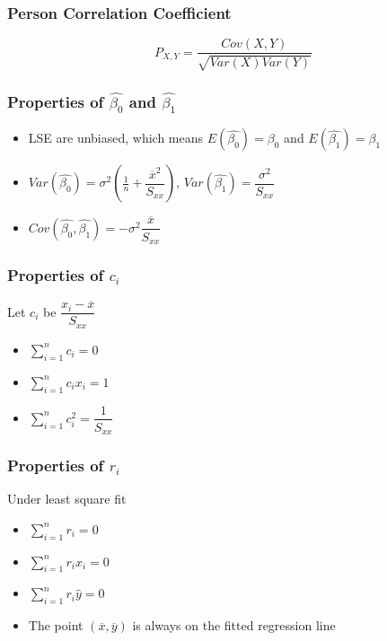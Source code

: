 \documentclass[11pt]{article}
\begin{document}
\subsubsection{Person Correlation Coefficient}
\[P_{X,Y} = \frac{Cov(X,Y)}{\sqrt{Var(X)Var(Y)}}\]
\subsubsection{Properties of $\hat{\beta_0}$ and $\hat{\beta_1}$}
\begin{itemize}
    \item LSE are unbiased, which means $E(\hat{\beta_0})=\beta_0$ and $E(\hat{\beta_1})=\beta_1$
    \item $Var(\hat{\beta_0})=\sigma^2(\frac{1}{n}+\dfrac{\overline{x}^2}{S_{xx}})$, $Var(\hat{\beta_1})=\dfrac{\sigma^2}{S_{xx}}$
    \item $Cov(\hat{\beta_0}, \hat{\beta_1})=-\sigma^2\dfrac{\overline{x}}{S_{xx}}$
\end{itemize}
\subsubsection{Properties of $c_i$}
Let $c_i$ be $\dfrac{x_i-\overline{x}}{S_{xx}}$
\begin{itemize}
    \item $\sum_{i=1}^{n}c_i=0$
    \item $\sum_{i=1}^{n}c_ix_i=1$
    \item $\sum_{i=1}^{n}c_i^2=\dfrac{1}{S_{xx}}$
\end{itemize}
\subsubsection{Properties of $r_i$}
Under least square fit
\begin{itemize}
    \item $\sum_{i=1}^{n}r_i=0$
    \item $\sum_{i=1}^{n}r_ix_i=0$
    \item $\sum_{i=1}^{n}r_i\hat{y}=0$
    \item The point $(\overline{x},\overline{y})$ is always on the fitted regression line 
\end{itemize}
\end{document}
